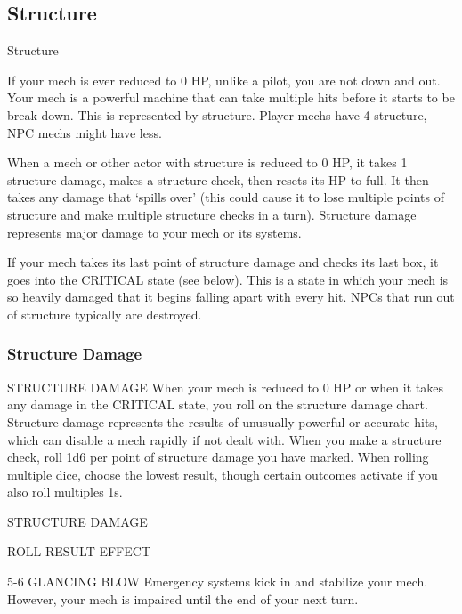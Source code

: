 \subsection{Structure}
                                                Structure  

If your mech is ever reduced to 0 HP, unlike a pilot, you are not down and out. Your mech is a  
powerful machine that can take multiple hits before it starts to be break down. This is  
represented by structure. Player mechs have 4 structure, NPC mechs might have less.
 

                                                                                                             


When a mech or other actor with structure is reduced to 0 HP, it takes 1 structure damage,  
makes a structure check, then resets its HP to full. It then takes any damage that ‘spills  
over’ (this could cause it to lose multiple points of structure and make multiple structure checks  
in a turn). Structure damage represents major damage to your mech or its systems.
 

If your mech takes its last point of structure damage and checks its last box, it goes into the  
CRITICAL state (see below). This is a state in which your mech is so heavily damaged that it  
begins falling apart with every hit. NPCs that run out of structure typically are destroyed.
 
\subsubsection{Structure Damage}
                                        STRUCTURE DAMAGE  
When your mech is reduced to 0 HP or when it takes any damage in the CRITICAL state, you roll  
on the structure damage chart. Structure damage represents the results of unusually powerful or  
accurate hits, which can disable a mech rapidly if not dealt with. When you make a structure  
check, roll 1d6 per point of structure damage you have marked. When rolling multiple dice,  
choose the lowest result, though certain outcomes activate if you also roll multiples 1s.
 

                                            STRUCTURE DAMAGE  

 ROLL            RESULT                   EFFECT 

 5-6             GLANCING BLOW            Emergency systems kick in and stabilize your mech. However, your  
                                          mech is impaired until the end of your next turn. 


